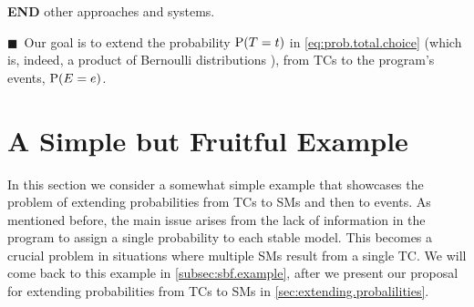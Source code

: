 \documentclass{article}
\newcommand{\at}[1]{\ensuremath{\!\del{#1}}}
\newcommand{\co}[1]{\ensuremath{\overline{#1}}}
\newcommand{\cla}[1]{\ensuremath{{\cal #1}}}
\newcommand{\prfunc}{\ensuremath{\mathrm{P}}}
\newcommand{\pr}[1]{\ensuremath{\prfunc\at{#1}}}
\newcommand{\given}{\ensuremath{~\middle|~}}
\newcommand{\probfact}[2]{\ensuremath{#1:#2}}%
\newcommand{\ATOMSset}{\ensuremath{\cla{A}}}
\newcommand{\LOOK}{\ensuremath{\blacksquare}}
\newcommand{\franc}[1]{{\color{green!30!black}#1}}
\newcounter{remark}
\newcommand{\note}[1]{
	\stepcounter{remark}%
	{\!\!\color{red}/}\footnotemark[\arabic{remark}]\!\!%
	\footnotetext[\arabic{remark}]{{\color{red}/}#1}
}
\begin{document}
\franc{\textbf{END} other approaches and systems.}

%
\franc{\LOOK~Our goal} is to extend the probability $\pr{T = t}$ in
\cref{eq:prob.total.choice} (which is, indeed, a product of Bernoulli
distributions \cite{Teugels90}), from \aclp{TC} to the program's
events, $\pr{E = e}$.







%
%
%
\section{A Simple but Fruitful Example}\label{sec:example.1}
%
%
%
In this section we consider a somewhat simple example that showcases
the problem of extending probabilities from \aclp{TC} to \aclp{SM} and
then to events.  As mentioned before, the main issue arises from the
lack of information in the program to assign a single probability to
each stable model.  This becomes a crucial problem in situations where
multiple \aclp{SM} result from a single \acl{TC}.  We will come back
to this example in \cref{subsec:sbf.example}, after we present our
proposal for extending probabilities from \aclp{TC} to \aclp{SM} in
\cref{sec:extending.probalilities}.
\end{document}
